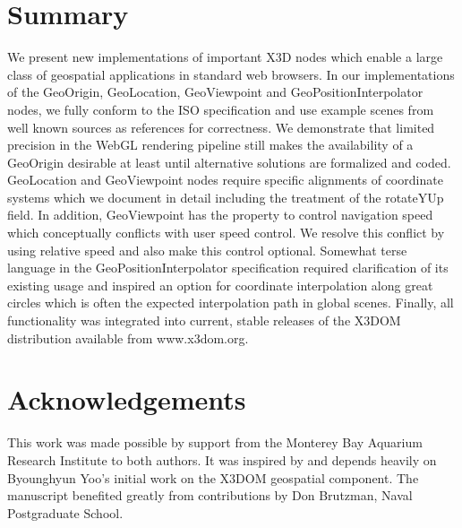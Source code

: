 \documentclass[review]{acmsiggraph}            %
\begin{document}
\section{Summary}

We present new implementations of important X3D nodes which enable a large class of geospatial
applications in standard web browsers. In our implementations of the GeoOrigin, GeoLocation,
GeoViewpoint and GeoPositionInterpolator nodes, we fully conform to the ISO specification and use
example scenes from well known sources as references for correctness. We demonstrate that limited
precision in the WebGL rendering pipeline still makes the availability of a GeoOrigin desirable at
least until alternative solutions are formalized and coded. GeoLocation and GeoViewpoint nodes
require specific alignments of coordinate systems which we document in detail including the
treatment of the rotateYUp field. In addition, GeoViewpoint has the property to control navigation
speed which conceptually conflicts with user speed control. We resolve this conflict by using
relative speed and also make this control optional. Somewhat terse language in the
GeoPositionInterpolator specification required clarification of its existing usage and inspired an
option for coordinate interpolation along great circles which is often the expected interpolation
path in global scenes. Finally, all functionality was integrated into current, stable releases of
the X3DOM distribution available from www.x3dom.org.


\section{Acknowledgements}

This work was made possible by support from the Monterey Bay Aquarium Research Institute to both authors. It was inspired by and depends heavily on Byounghyun Yoo's initial work on the X3DOM geospatial component. The manuscript benefited greatly from contributions by Don Brutzman, Naval Postgraduate School.

 \nocite{*} 
\end{document}
